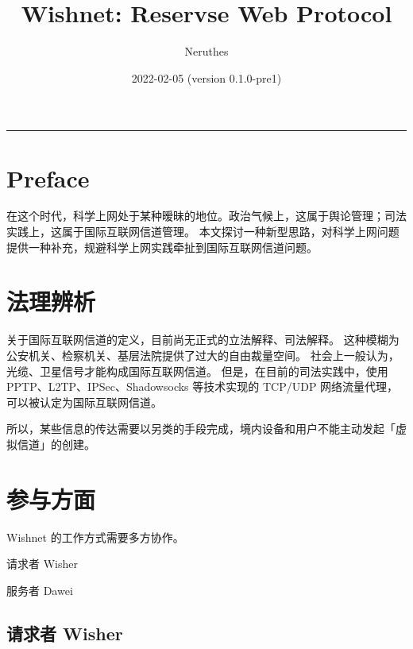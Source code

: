 \documentclass[a4paper,11pt]{article}
\title{Wishnet: Reservse Web Protocol}
\author{Neruthes}
\date{2022-02-05 (version 0.1.0-pre1)}
\begin{document}
\rmfamily


\begin{minipage}{\linewidth}
    \maketitle

    \sffamily
    \tableofcontents
\end{minipage}
\vspace{30pt}
\hrule
\vspace{1pt}





\section{Preface}

在这个时代，科学上网处于某种暧昧的地位。政治气候上，这属于舆论管理；司法实践上，这属于国际互联网信道管理。
本文探讨一种新型思路，对科学上网问题提供一种补充，规避科学上网实践牵扯到国际互联网信道问题。



\section{法理辨析}

关于国际互联网信道的定义，目前尚无正式的立法解释、司法解释。
这种模糊为公安机关、检察机关、基层法院提供了过大的自由裁量空间。
社会上一般认为，光缆、卫星信号才能构成国际互联网信道。
但是，在目前的司法实践中，使用 PPTP、L2TP、IPSec、Shadowsocks 等技术实现的 TCP/UDP 网络流量代理，可以被认定为国际互联网信道。

所以，某些信息的传达需要以另类的手段完成，境内设备和用户不能主动发起「虚拟信道」的创建。



\section{参与方面}

Wishnet 的工作方式需要多方协作。

\begin{compactitem}
	\item 请求者 Wisher
	\item 服务者 Dawei
\end{compactitem}

\subsection{请求者 Wisher}
\end{document}
